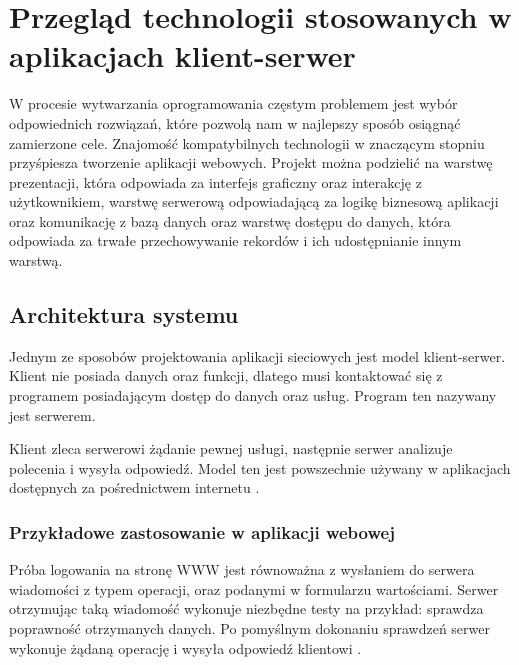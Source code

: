 \chapter{Przegląd technologii stosowanych w aplikacjach klient-serwer}
W procesie wytwarzania oprogramowania częstym problemem jest wybór odpowiednich rozwiązań, które pozwolą nam w najlepszy sposób osiągnąć zamierzone cele. Znajomość kompatybilnych technologii w znaczącym stopniu przyśpiesza tworzenie aplikacji webowych. Projekt można podzielić na warstwę prezentacji, która odpowiada za interfejs graficzny oraz interakcję z użytkownikiem, warstwę serwerową odpowiadającą za logikę biznesową aplikacji oraz komunikację z bazą danych oraz warstwę dostępu do danych, która odpowiada za trwałe przechowywanie rekordów i ich udostępnianie innym warstwą.
\section{Architektura systemu}
Jednym ze sposobów projektowania aplikacji sieciowych jest model klient-serwer. Klient nie posiada danych oraz funkcji, dlatego musi kontaktować się z programem posiadającym dostęp do danych oraz usług. Program ten nazywany jest serwerem. 

Klient zleca serwerowi żądanie pewnej usługi, następnie serwer analizuje polecenia i wysyła odpowiedź. Model ten jest powszechnie używany w aplikacjach dostępnych za pośrednictwem internetu \cite{ArchKS}. 

\subsection*{Przykładowe zastosowanie w aplikacji webowej}
Próba logowania na stronę WWW jest równoważna z wysłaniem do serwera wiadomości z typem operacji, oraz podanymi w formularzu wartościami. Serwer otrzymując taką wiadomość wykonuje niezbędne testy na przykład: sprawdza poprawność otrzymanych danych. Po pomyślnym dokonaniu sprawdzeń serwer wykonuje żądaną operację i wysyła odpowiedź klientowi \cite{ArchKS}.

